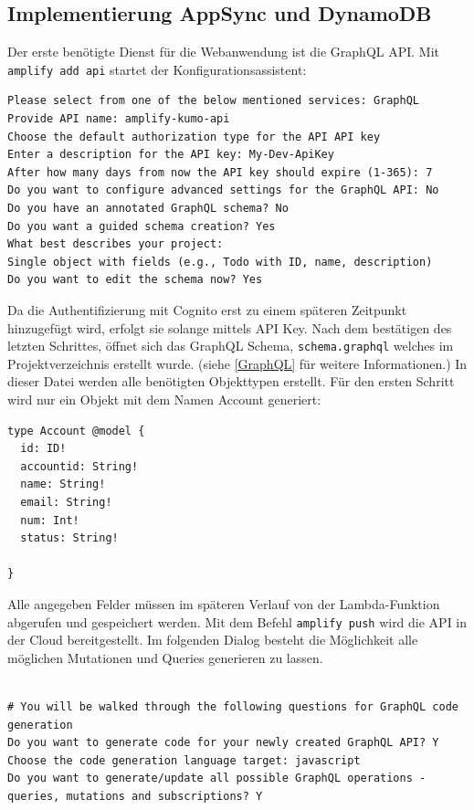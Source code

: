 \subsection{Implementierung AppSync und DynamoDB}
Der erste benötigte Dienst für die Webanwendung ist die GraphQL API.
Mit \verb+amplify add api+ startet der Konfigurationsassistent:

\begin{lstlisting}[basicstyle=\ttfamily\small, breaklines=true , frame = single, backgroundcolor=\color{lavender} ]
Please select from one of the below mentioned services: GraphQL
Provide API name: amplify-kumo-api
Choose the default authorization type for the API API key
Enter a description for the API key: My-Dev-ApiKey
After how many days from now the API key should expire (1-365): 7
Do you want to configure advanced settings for the GraphQL API: No
Do you have an annotated GraphQL schema? No
Do you want a guided schema creation? Yes
What best describes your project:
Single object with fields (e.g., Todo with ID, name, description)
Do you want to edit the schema now? Yes

\end{lstlisting}

Da die Authentifizierung mit Cognito erst zu einem späteren Zeitpunkt hinzugefügt wird, erfolgt sie solange mittels API Key.
Nach dem bestätigen des letzten Schrittes, öffnet sich das GraphQL Schema, \verb+schema.graphql+ welches im Projektverzeichnis erstellt wurde. (siehe \ref{GraphQL}  für weitere Informationen.)
In dieser Datei werden alle benötigten Objekttypen erstellt.
Für den ersten Schritt wird nur ein Objekt mit dem Namen Account generiert:

\begin{lstlisting}[basicstyle=\ttfamily\small, breaklines=true , frame = single, backgroundcolor=\color{lightgray} ]
type Account @model {
  id: ID!
  accountid: String!
  name: String!
  email: String!
  num: Int!
  status: String!

}

\end{lstlisting}

Alle angegeben Felder müssen im späteren Verlauf von der Lambda-Funktion abgerufen und gespeichert werden.
Mit dem Befehl \verb+amplify push+ wird die API in der Cloud bereitgestellt.
Im folgenden Dialog besteht die Möglichkeit alle möglichen Mutationen und Queries generieren zu lassen.

\begin{lstlisting}[basicstyle=\ttfamily\small, breaklines=true , frame = single, backgroundcolor=\color{lavender} ]

# You will be walked through the following questions for GraphQL code generation
Do you want to generate code for your newly created GraphQL API? Y
Choose the code generation language target: javascript
Do you want to generate/update all possible GraphQL operations - queries, mutations and subscriptions? Y
\end{lstlisting}

